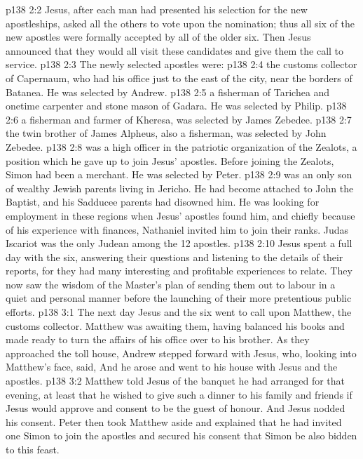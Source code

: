 \vs p138 2:2 Jesus, after each man had presented his selection for the new apostleships, asked all the others to vote upon the nomination; thus all six of the new apostles were formally accepted by all of the older six. Then Jesus announced that they would all visit these candidates and give them the call to service.
\vs p138 2:3 The newly selected apostles were:
\vs p138 2:4 \bibnobreakspace {} the customs collector of Capernaum, who had his office just to the east of the city, near the borders of Batanea. He was selected by Andrew.
\vs p138 2:5 \bibnobreakspace {} a fisherman of Tarichea and onetime carpenter and stone mason of Gadara. He was selected by Philip.
\vs p138 2:6 \bibnobreakspace {} a fisherman and farmer of Kheresa, was selected by James Zebedee.
\vs p138 2:7 \bibnobreakspace {} the twin brother of James Alpheus, also a fisherman, was selected by John Zebedee.
\vs p138 2:8 \bibnobreakspace {} was a high officer in the patriotic organization of the Zealots, a position which he gave up to join Jesus’ apostles. Before joining the Zealots, Simon had been a merchant. He was selected by Peter.
\vs p138 2:9 \bibnobreakspace {} was an only son of wealthy Jewish parents living in Jericho. He had become attached to John the Baptist, and his Sadducee parents had disowned him. He was looking for employment in these regions when Jesus’ apostles found him, and chiefly because of his experience with finances, Nathaniel invited him to join their ranks. Judas Iscariot was the only Judean among the 12 apostles.
\vs p138 2:10 \pc Jesus spent a full day with the six, answering their questions and listening to the details of their reports, for they had many interesting and profitable experiences to relate. They now saw the wisdom of the Master’s plan of sending them out to labour in a quiet and personal manner before the launching of their more pretentious public efforts.
\vs p138 3:1 The next day Jesus and the six went to call upon Matthew, the customs collector. Matthew was awaiting them, having balanced his books and made ready to turn the affairs of his office over to his brother. As they approached the toll house, Andrew stepped forward with Jesus, who, looking into Matthew’s face, said,  And he arose and went to his house with Jesus and the apostles.
\vs p138 3:2 Matthew told Jesus of the banquet he had arranged for that evening, at least that he wished to give such a dinner to his family and friends if Jesus would approve and consent to be the guest of honour. And Jesus nodded his consent. Peter then took Matthew aside and explained that he had invited one Simon to join the apostles and secured his consent that Simon be also bidden to this feast.
